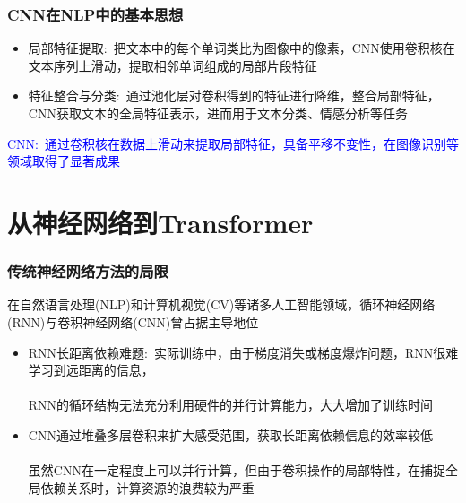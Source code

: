 \begin{frame}
	\frametitle{\textrm{CNN}在\textrm{NLP}中的基本思想}
    \begin{itemize}
		\setlength{\itemsep}{10pt}
		\item 局部特征提取:~把文本中的每个单词类比为图像中的像素，\textrm{CNN}使用卷积核在文本序列上滑动，提取相邻单词组成的局部片段特征\\
			{\fontsize{7.2pt}{6.2pt}\selectfont{多个不同大小的卷积核能够提取多种尺度的特征，捕捉单词间的局部语义关系}}
        \item 特征整合与分类:~通过池化层对卷积得到的特征进行降维，整合局部特征，\textrm{CNN}获取文本的全局特征表示，进而用于文本分类、情感分析等任务\\
		{\fontsize{7.2pt}{6.2pt}\selectfont{例如在情感分析中，通过卷积和池化操作提取文本特征，再经全连接层判断文本表达的情感倾向}}
    \end{itemize}
    \textcolor{blue}{\textrm{CNN}:~通过卷积核在数据上滑动来提取局部特征，具备平移不变性，在图像识别等领域取得了显著成果}\\
    \vskip 2pt
    {\fontsize{8.2pt}{6.2pt}}
\end{frame}

\section{从神经网络到\rm{Transformer}}
\begin{frame}
	\frametitle{传统神经网络方法的局限}
    在自然语言处理\textrm{(NLP)}和计算机视觉\textrm{(CV)}等诸多人工智能领域，循环神经网络\textrm{(RNN)}与卷积神经网络\textrm{(CNN)}曾占据主导地位\\
    {\fontsize{7.2pt}{6.2pt}\selectfont{\textcolor{red}{随着数据规模的增长和任务复杂度的提升，传统神经网络在长距离依赖和并行计算方面的局限性逐渐凸显}}}
    \begin{itemize}
	    \item \textrm{RNN}长距离依赖难题:~实际训练中，由于梯度消失或梯度爆炸问题，\textrm{RNN}很难学习到远距离的信息，\\
		    {\fontsize{7.2pt}{6.2pt}\selectfont{\textcolor{red}{例如:~在文本翻译任务中，开头的单词信息很难传递到句子末尾}}}\\
		    \textrm{RNN}的循环结构无法充分利用硬件的并行计算能力，大大增加了训练时间
	    \item \textrm{CNN}通过堆叠多层卷积来扩大感受范围，获取长距离依赖信息的效率较低\\
		    {\fontsize{7.2pt}{6.2pt}\selectfont{\textcolor{red}{比如:~在处理长文本时，难以直接捕捉到相隔较远的文本片段之间的语义关联}}}\\
		    虽然\textrm{CNN}在一定程度上可以并行计算，但由于卷积操作的局部特性，在捕捉全局依赖关系时，计算资源的浪费较为严重
    \end{itemize}
\end{frame}


